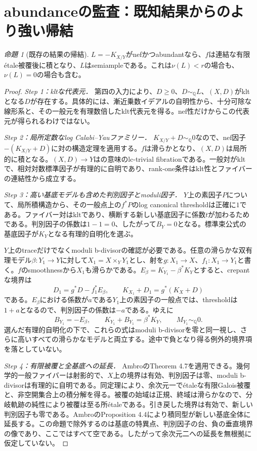 \documentclass[12pt]{amsart}
\theoremstyle{definition}
\theoremstyle{remark}
\numberwithin{equation}{section}
\newcommand{\Q}{\mathbb{Q}}
\newtheorem{jprop}[thm]{命題}
\begin{document}
\section{abundanceの監査：既知結果からのより強い帰結}\label{ja:auditproof}
\begin{jprop}[既存の結果の帰結]\label{ja:abundant}
$L=-K_{X/Y}$がnefかつabundantなら、$f$は連結な有限étale被覆後に積となり、$L$はsemiampleである。これは$\nu(L)<r$の場合も、$\nu(L)=0$の場合も含む。
\end{jprop}
\begin{proof}
\textit{Step 1：kltな代表元．}
第四の入力により、$D\geq0$、$D\sim_\Q L$、$(X,D)$がkltとなる$D$が存在する。具体的には、漸近乗数イデアルの自明性から、十分可除な線形系と、その一般元を有理数倍したklt代表元を得る。nef性だけからこの代表元が得られるわけではない。

\textit{Step 2：局所定数なlog Calabi--Yauファミリー．}
$K_{X/Y}+D\sim_\Q0$なので、nef因子$-(K_{X/Y}+D)$に対の構造定理を適用する。$f$は滑らかとなり、$(X,D)$は局所的に積となる。$(X,D)\to Y$は\cite{ja:Amb}の意味のlc-trivial fibrationである。一般対がkltで、相対対数標準因子が有理的に自明であり、rank-one条件はklt性とファイバーの連結性から成立する。

\textit{Step 3：高い基底モデルも含めた判別因子とmoduli因子．}
$Y$上の素因子$P$について、局所積構造から、その一般点上の$f^*P$のlog canonical thresholdは正確に$1$である。ファイバー対はkltであり、横断する新しい基底因子に係数$t$が加わるためである。判別因子の係数は$1-1=0$、したがって$B_Y=0$となる。標準束公式の基底因子が$K_Y$となる有理的自明化を選ぶ。

$Y$上のtraceだけでなくmoduli b-divisorの確認が必要である。任意の滑らかな双有理モデル$\beta:Y_1\to Y$に対して$X_1=X\times_Y Y_1$とし、射を$g:X_1\to X$、$f_1:X_1\to Y_1$と書く。$f$のsmoothnessから$X_1$も滑らかである。$E_\beta=K_{Y_1}-\beta^*K_Y$とすると、crepantな境界は
\[
 D_1=g^*D-f_1^*E_\beta,
 \qquad K_{X_1}+D_1=g^*(K_X+D)
\]
である。$E_\beta$における係数が$a$である$Y_1$上の素因子の一般点では、thresholdは$1+a$となるので、判別因子の係数は$-a$である。ゆえに
\[
 B_{Y_1}=-E_\beta,\qquad
 K_{Y_1}+B_{Y_1}=\beta^*K_Y,\qquad M_{Y_1}\sim_\Q0.
\]
選んだ有理的自明化の下で、これらの式はmoduli b-divisorを零と同一視し、さらに高いすべての滑らかなモデルと両立する。途中で負となり得る例外的境界項を落としていない。

\textit{Step 4：有限被覆と全基底への延長．}
AmbroのTheorem 4.7を適用できる。幾何学的一般ファイバーは射影的で、$X$上の境界は有効、判別因子は零、moduli b-divisorは有理的に自明である。同定理により、余次元一でétaleな有限Galois被覆と、非空開集合上の積分解を得る。被覆の始域は正規、終域は滑らかなので、分岐軌跡の純性\cite[Tag 0BMB]{ja:Stacks}により被覆は至る所étaleである。引き戻した境界は有効で、新しい判別因子も零である。AmbroのProposition 4.4により積同型が新しい基底全体に延長する。この命題で除外するのは基底の特異点、判別因子の台、負の垂直境界の像であり、ここではすべて空である。したがって余次元二への延長を無根拠に仮定していない。


\end{proof}
\end{document}
